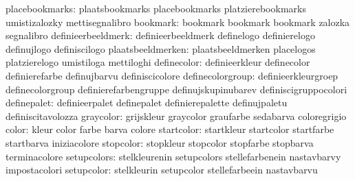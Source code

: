                   placebookmarks: plaatsbookmarks                  placebookmarks
                                  platzierebookmarks               umistizalozky
                                  mettisegnalibro
                        bookmark: bookmark                         bookmark
                                  bookmark                         zalozka
                                  segnalibro
              definieerbeeldmerk: definieerbeeldmerk               definelogo
                                  definierelogo                    definujlogo
                                  definiscilogo
               plaatsbeeldmerken: plaatsbeeldmerken                placelogos
                                  platzierelogo                    umistiloga
                                  mettiloghi
                    definecolor:  definieerkleur                   definecolor
                                  definierefarbe                   definujbarvu
                                  definiscicolore
               definecolorgroup:  definieerkleurgroep              definecolorgroup
                                  definierefarbengruppe            definujskupinubarev
                                  definiscigruppocolori
                    definepalet:  definieerpalet                   definepalet
                                  definierepalette                 definujpaletu
                                  definiscitavolozza
                      graycolor:  grijskleur                       graycolor
                                  graufarbe                        sedabarva
                                  coloregrigio
                          color:  kleur                            color
                                  farbe                            barva
                                  colore
                     startcolor:  startkleur                       startcolor
                                  startfarbe                       startbarva
                                  iniziacolore
                      stopcolor:  stopkleur                        stopcolor
                                  stopfarbe                        stopbarva
                                  terminacolore
                    setupcolors:  stelkleurenin                    setupcolors
                                  stellefarbenein                  nastavbarvy
                                  impostacolori
                     setupcolor:  stelkleurin                      setupcolor
                                  stellefarbeein                   nastavbarvu
